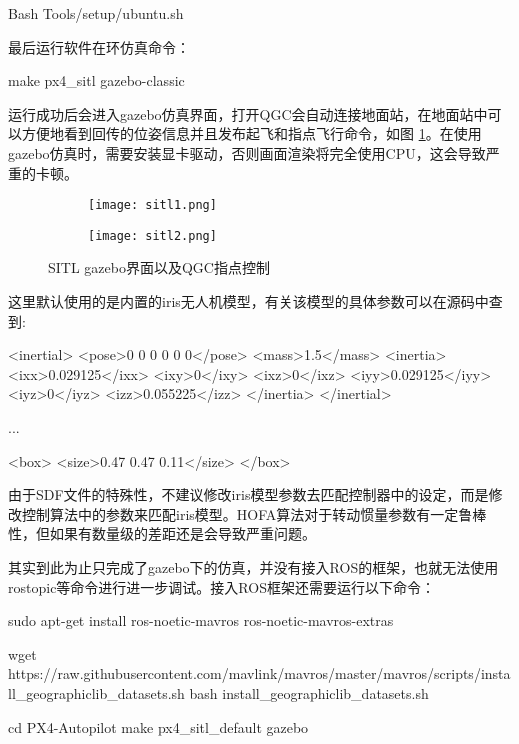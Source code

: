 \begin{codeblock}[language=C]
  Bash Tools/setup/ubuntu.sh
\end{codeblock}


最后运行软件在环仿真命令：

\begin{codeblock}[language=C]
  make px4_sitl gazebo-classic
\end{codeblock}



运行成功后会进入gazebo仿真界面，打开QGC会自动连接地面站，在地面站中可以方便地看到回传的位姿信息并且发布起飞和指点飞行命令，如图 \ref{sitl}。在使用gazebo仿真时，需要安装显卡驱动，否则画面渲染将完全使用CPU，这会导致严重的卡顿。

\begin{figure}[h]
  \centering
     \begin{subfigure}[c]{0.45\textwidth}
      \centering
      \texttt{[image: sitl1.png]}
   \end{subfigure}%
     \begin{subfigure}[c]{0.45\textwidth}
      \centering
      \texttt{[image: sitl2.png]}
   \end{subfigure}
   \caption{SITL gazebo界面以及QGC指点控制}
   \label{sitl}
 \end{figure}

 这里默认使用的是内置的iris无人机模型，有关该模型的具体参数可以在源码\cite{iris}中查到:

 \begin{codeblock}[language=C]
  <inertial>
    <pose>0 0 0 0 0 0</pose>
    <mass>1.5</mass>
    <inertia>
      <ixx>0.029125</ixx>
      <ixy>0</ixy>
      <ixz>0</ixz>
      <iyy>0.029125</iyy>
      <iyz>0</iyz>
      <izz>0.055225</izz>
    </inertia>
  </inertial>

...

<box>
  <size>0.47 0.47 0.11</size>
</box>
 \end{codeblock}

 
由于SDF文件的特殊性，不建议修改iris模型参数去匹配控制器中的设定，而是修改控制算法中的参数来匹配iris模型。HOFA算法对于转动惯量参数有一定鲁棒性，但如果有数量级的差距还是会导致严重问题。

其实到此为止只完成了gazebo下的仿真，并没有接入ROS的框架，也就无法使用rostopic等命令进行进一步调试。接入ROS框架还需要运行以下命令：
\begin{codeblock}
  sudo apt-get install ros-noetic-mavros ros-noetic-mavros-extras

  wget https://raw.githubusercontent.com/mavlink/mavros/master/mavros/scripts/install_geographiclib_datasets.sh
  bash install_geographiclib_datasets.sh

  cd PX4-Autopilot
  make px4_sitl_default gazebo
\end{codeblock}

